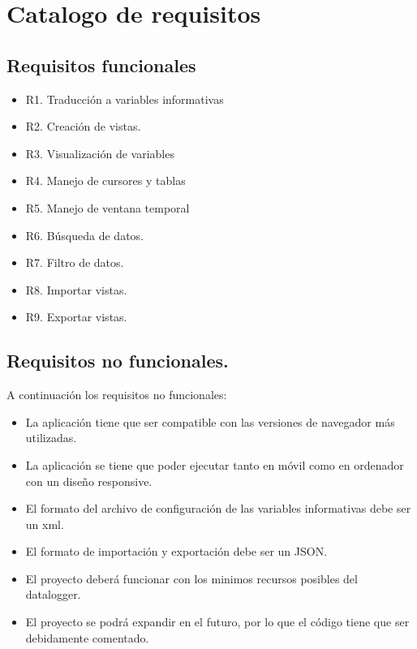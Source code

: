 \section{Catalogo de requisitos}

\subsection{Requisitos funcionales}


\begin{itemize}
	\item R1. Traducción a variables informativas

	\item R2. Creación de vistas.
	\item R3. Visualización de variables
	\item R4. Manejo de cursores y tablas
	\item R5. Manejo de ventana temporal

	\item R6. Búsqueda de datos.

	\item R7. Filtro de datos.

	\item R8. Importar vistas.

	\item R9. Exportar vistas.
\end{itemize}











\subsection{Requisitos no funcionales.}

A continuación los requisitos no funcionales:

\begin{itemize}
	\item La aplicación tiene que ser compatible con las versiones de navegador más utilizadas.

	\item La aplicación se tiene que poder ejecutar tanto en móvil como en ordenador con un diseño responsive.

	\item El formato del archivo de configuración de las variables informativas debe ser un xml.

	\item El formato de importación y exportación debe ser un JSON.

	\item El proyecto deberá funcionar con los minimos recursos posibles del datalogger.

	\item El proyecto se podrá expandir en el futuro, por lo que el código tiene que ser debidamente comentado.

\end{itemize}




